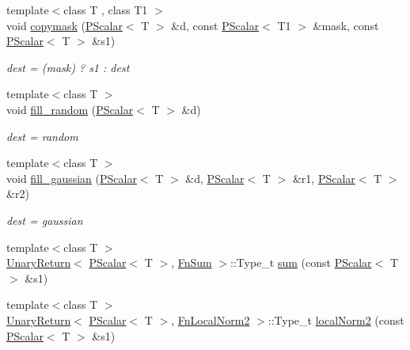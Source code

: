\begin{DoxyCompactItemize}
{\footnotesize template$<$class T , class T1 $>$ }\\void \mbox{\hyperlink{group__primscalar_gae14d6fea866a875601cb8d100fc8b3c2}{copymask}} (\mbox{\hyperlink{classENSEM_1_1PScalar}{P\+Scalar}}$<$ T $>$ \&d, const \mbox{\hyperlink{classENSEM_1_1PScalar}{P\+Scalar}}$<$ T1 $>$ \&mask, const \mbox{\hyperlink{classENSEM_1_1PScalar}{P\+Scalar}}$<$ T $>$ \&s1)
\begin{DoxyCompactList}\small\item\em dest = (mask) ? s1 \+: dest \end{DoxyCompactList}\item 
{\footnotesize template$<$class T $>$ }\\void \mbox{\hyperlink{group__primscalar_ga7524cfb0562281bfab7fb3eca1daba0d}{fill\+\_\+random}} (\mbox{\hyperlink{classENSEM_1_1PScalar}{P\+Scalar}}$<$ T $>$ \&d)
\begin{DoxyCompactList}\small\item\em dest = random \end{DoxyCompactList}\item 
{\footnotesize template$<$class T $>$ }\\void \mbox{\hyperlink{group__primscalar_gaec5e0050ee9c339ede0d4b1a839cea7b}{fill\+\_\+gaussian}} (\mbox{\hyperlink{classENSEM_1_1PScalar}{P\+Scalar}}$<$ T $>$ \&d, \mbox{\hyperlink{classENSEM_1_1PScalar}{P\+Scalar}}$<$ T $>$ \&r1, \mbox{\hyperlink{classENSEM_1_1PScalar}{P\+Scalar}}$<$ T $>$ \&r2)
\begin{DoxyCompactList}\small\item\em dest = gaussian \end{DoxyCompactList}\item 
{\footnotesize template$<$class T $>$ }\\\mbox{\hyperlink{structENSEM_1_1UnaryReturn}{Unary\+Return}}$<$ \mbox{\hyperlink{classENSEM_1_1PScalar}{P\+Scalar}}$<$ T $>$, \mbox{\hyperlink{structENSEM_1_1FnSum}{Fn\+Sum}} $>$\+::Type\+\_\+t \mbox{\hyperlink{group__primscalar_gaa2733f98f3fc41be9ea11939aa1ee01b}{sum}} (const \mbox{\hyperlink{classENSEM_1_1PScalar}{P\+Scalar}}$<$ T $>$ \&s1)
\item 
{\footnotesize template$<$class T $>$ }\\\mbox{\hyperlink{structENSEM_1_1UnaryReturn}{Unary\+Return}}$<$ \mbox{\hyperlink{classENSEM_1_1PScalar}{P\+Scalar}}$<$ T $>$, \mbox{\hyperlink{structENSEM_1_1FnLocalNorm2}{Fn\+Local\+Norm2}} $>$\+::Type\+\_\+t \mbox{\hyperlink{group__primscalar_ga21e7b79db399d760e036194c689a5291}{local\+Norm2}} (const \mbox{\hyperlink{classENSEM_1_1PScalar}{P\+Scalar}}$<$ T $>$ \&s1)

\end{DoxyCompactItemize}
